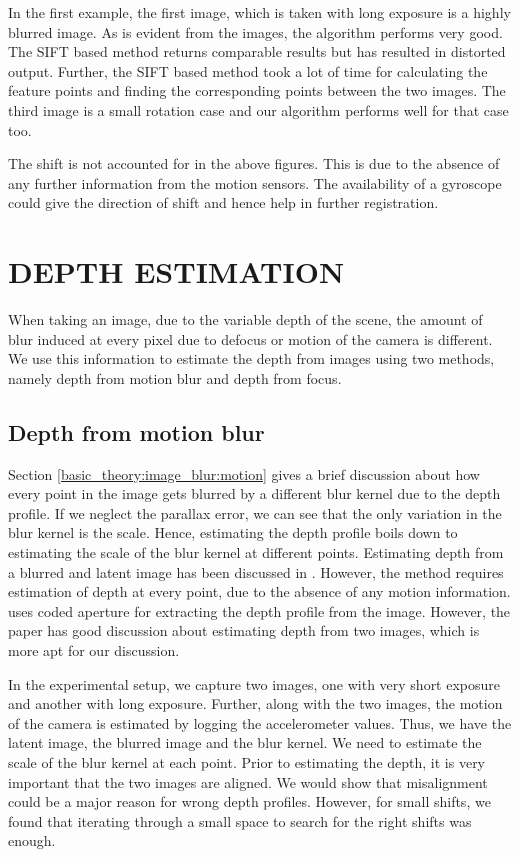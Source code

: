 \documentclass[BTech]{iitmdiss}
\begin{document}
In the first example, the first image, which is taken with long exposure
is a highly blurred image. As is evident from the images, the algorithm
performs very good. The SIFT based method returns comparable results but
has resulted in distorted output. Further, the SIFT based method took a lot
of time for calculating the feature points and finding the corresponding 
points between the two images. The third image is a small rotation case and our
algorithm performs well for that case too.

The shift is not accounted for in the above figures. This is due to the
absence of any further information from the motion sensors. The availability
of a gyroscope could give the direction of shift and hence help in 
further registration.

\pagebreak
\chapter{DEPTH ESTIMATION}
\label{chap:depth_estimation}
When taking an image, due to the variable depth of the scene, the amount 
of blur induced at every pixel due to defocus or motion of the camera is different. We use this information to estimate the depth from images using
two methods, namely depth from motion blur and depth from focus.

\section{Depth from motion blur}
\label{depth_estimation:motion}
Section \ref{basic_theory:image_blur:motion} gives a brief discussion 
about how every point in the image gets blurred by a different blur 
kernel due to the depth profile. If we neglect the parallax error, we 
can see that the only variation in the blur kernel is the scale. Hence,
estimating the depth profile boils down to estimating the scale of the 
blur kernel at different points. Estimating depth from a blurred and 
latent image has been discussed in \cite{paramanand2010unscented}. However,
the method requires estimation of depth at every point, due to the 
absence of any motion information. \cite{levin2007image} uses coded 
aperture for extracting the depth profile from the image. However, the
paper has good discussion about estimating depth from two images, which
is more apt for our discussion.

In the experimental setup, we capture two images, one with very short exposure and another with long exposure. 
Further, along with the two images, the motion of the camera is 
estimated by logging the accelerometer values. Thus, we have the latent
image, the blurred image and the blur kernel. We need to estimate the 
scale of the blur kernel at each point. Prior to estimating the depth,
it is very important that the two images are aligned. We would show that
misalignment could be a major reason for wrong depth profiles. However,
for small shifts, we found that iterating through a small space to search
for the right shifts was enough.
\end{document}
